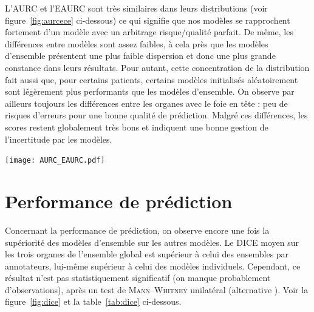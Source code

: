 \documentclass[a4paper,french,bookmarks,12pt]{article}
\begin{document}
    L'AURC et l'EAURC sont très similaires dans leurs distributions (voir figure~\ref{fig:aurcece} ci-dessous) ce qui signifie que nos modèles se rapprochent fortement d'un modèle avec un arbitrage risque/qualité parfait. De même, les différences entre modèles sont assez faibles, à cela près que les modèles d'ensemble présentent une plus faible dispersion et donc une plus grande constance dans leurs résultats. Pour autant, cette concentration de la distribution fait aussi que, pour certains patients, certains modèles initialisés aléatoirement sont légèrement plus performants que les modèles d'ensemble. On observe par ailleurs toujours les différences entre les organes avec le foie en tête : peu de risques d'erreurs pour une bonne qualité de prédiction. Malgré ces différences, les scores restent globalement très bons et indiquent une bonne gestion de l'incertitude par les modèles.

    \begin{center}
        \centering
        \texttt{[image: AURC\_EAURC.pdf]}
        \label{fig:aurcece}
    \end{center}

    \section{Performance de prédiction}

    Concernant la performance de prédiction, on observe encore une fois la supériorité des modèles d'ensemble sur les autres modèles. Le DICE moyen sur les trois organes de l'ensemble global est supérieur à celui des ensembles par annotateurs, lui-même supérieur à celui des modèles individuels. Cependant, ce résultat n'est pas statistiquement significatif (on manque probablement d'observations), après un test de \textsc{Mann–Whitney} unilatéral (alternative ). Voir la figure~\ref{fig:dice} et la table~\ref{tab:dice} ci-dessous.
\end{document}
